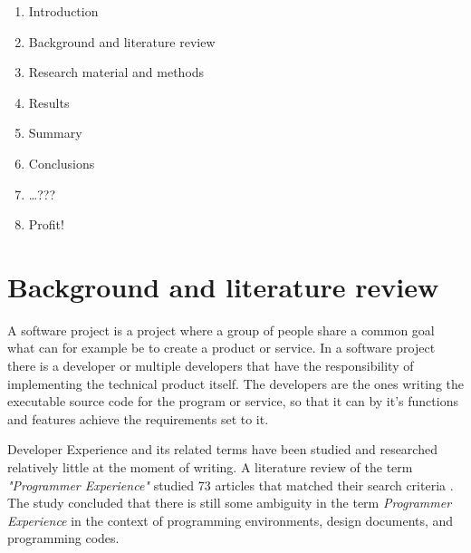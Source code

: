 \documentclass[english, 12pt, a4paper, sci, utf8, a-1b, online]{aaltothesis}
\begin{document}
\begin{enumerate}
  \item Introduction
  \item Background and literature review
  \item Research material and methods
  \item Results
  \item Summary
  \item Conclusions
  \item \dots ???
  \item Profit!
\end{enumerate}

\clearpage
\section{Background and literature review}





A software project is a project where a group of people share a common goal what can for example be to create a product or service. In a software project there is a developer or multiple developers that have the responsibility of implementing the technical product itself. The developers are the ones writing the executable source code for the program or service, so that it can by it's functions and features achieve the requirements set to it.

Developer Experience and its related terms have been studied and researched relatively little at the moment of writing. A literature review of the term \textit{"Programmer Experience"} studied 73 articles that matched their search criteria \cite{programmer-experience}. The study concluded that there is still some ambiguity in the term \textit{Programmer Experience} in the context of programming environments, design documents, and programming codes.
\end{document}
